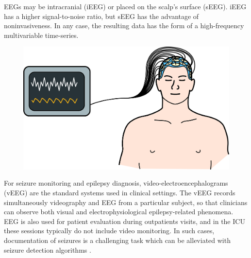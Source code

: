 EEGs may be intracranial (iEEG) or placed on the scalp's surface (sEEG). iEEG has a higher signal-to-noise ratio, but sEEG has the advantage of noninvasiveness. In any case, the resulting data has the form of a high-frequency multivariable time-series.

\begin{figure}[h]
    \centering
    \includegraphics[width=\textwidth]{c1Introduction/eeg_easy_pics.jpg}
    \label{fig:c1intro:eeg}
\end{figure}


For seizure monitoring and epilepsy diagnosis, video-electroencephalograms (vEEG) are the standard systems used in clinical settings. The vEEG records simultaneously videography and EEG from a particular subject, so that clinicians can observe both visual and electrophysiological epilepsy-related phenomena. EEG is also used for patient evaluation during outpatients visits, and in the ICU these sessions typically do not include video monitoring. In such cases, documentation of seizures is a challenging task which can be alleviated with seizure detection algorithms \cite{goldstein2021documentation}.

